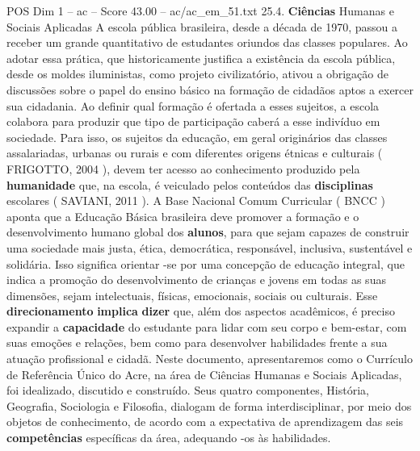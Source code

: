 \begin{textsample}{POS Dim 1 – ac – Score 43.00 – ac/ac\_em\_51.txt}  \label{ex:f1_pos_179}
25.4. \textbf{Ciências} Humanas e Sociais Aplicadas A escola pública brasileira, desde a década de 1970, passou a receber um grande quantitativo de estudantes oriundos das classes populares.
Ao adotar essa prática, que historicamente justifica a existência da escola pública, desde os moldes iluministas, como projeto civilizatório, ativou a obrigação de discussões sobre o papel do ensino básico na formação de cidadãos aptos a exercer sua cidadania.
Ao definir qual formação é ofertada a esses sujeitos, a escola colabora para produzir que tipo de participação caberá a esse indivíduo em sociedade.
Para isso, os sujeitos da educação, em geral originários das classes assalariadas, urbanas ou rurais e com diferentes origens étnicas e culturais ( FRIGOTTO, 2004 ), devem ter acesso ao conhecimento produzido pela \textbf{humanidade} que, na escola, é veiculado pelos conteúdos das \textbf{disciplinas} escolares ( SAVIANI, 2011 ).
A Base Nacional Comum Curricular ( BNCC ) aponta que a Educação Básica brasileira deve promover a formação e o desenvolvimento humano global dos \textbf{alunos}, para que sejam capazes de construir uma sociedade mais justa, ética, democrática, responsável, inclusiva, sustentável e solidária.
Isso significa orientar -se por uma concepção de educação integral, que indica a promoção do desenvolvimento de crianças e jovens em todas as suas dimensões, sejam intelectuais, físicas, emocionais, sociais ou culturais.
Esse \textbf{direcionamento} \textbf{implica} \textbf{dizer} que, além dos aspectos acadêmicos, é preciso expandir a \textbf{capacidade} do estudante para lidar com seu corpo e bem-estar, com suas emoções e relações, bem como para desenvolver habilidades frente a sua atuação profissional e cidadã.
Neste documento, apresentaremos como o Currículo de Referência Único do Acre, na área de Ciências Humanas e Sociais Aplicadas, foi idealizado, discutido e construído.
Seus quatro componentes, História, Geografia, Sociologia e Filosofia, dialogam de forma interdisciplinar, por meio dos objetos de conhecimento, de acordo com a expectativa de aprendizagem das seis \textbf{competências} específicas da área, adequando -os às habilidades.

\end{textsample}
